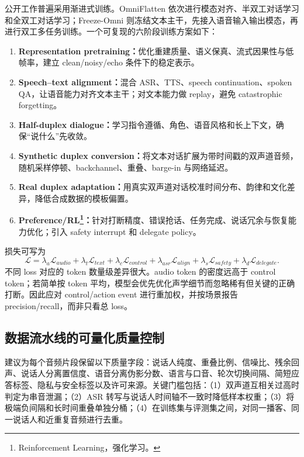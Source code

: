 \documentclass[UTF8,fontset=none,a4paper,10pt]{ctexart}
\begin{document}
公开工作普遍采用渐进式训练。OmniFlatten 依次进行模态对齐、半双工对话学习和全双工对话学习\cite{zhang2024omniflatten}；Freeze-Omni 则冻结文本主干，先接入语音输入输出模态，再进行双工多任务训练\cite{wang2024freezeomni}。一个可复现的六阶段训练方案如下：

\begin{enumerate}
  \item \textbf{Representation pretraining：}优化重建质量、语义保真、流式因果性与低帧率，建立 clean/noisy/echo 条件下的稳定表示。
  \item \textbf{Speech--text alignment：}混合 ASR、TTS、speech continuation、spoken QA，让语音能力对齐文本主干；对文本能力做 replay，避免 catastrophic forgetting。
  \item \textbf{Half-duplex dialogue：}学习指令遵循、角色、语音风格和长上下文，确保“说什么”先收敛。
  \item \textbf{Synthetic duplex conversion：}将文本对话扩展为带时间戳的双声道音频，随机采样停顿、backchannel、重叠、barge-in 与网络延迟。
  \item \textbf{Real duplex adaptation：}用真实双声道对话校准时间分布、韵律和文化差异，降低合成数据的模板偏置。
  \item \textbf{Preference/RL\footnote{Reinforcement Learning，强化学习。}：}针对打断精度、错误抢话、任务完成、说话冗余与恢复能力优化；引入 safety interrupt 和 delegate policy。
\end{enumerate}

损失可写为
\begin{equation}
\mathcal L=\lambda_a\mathcal L_{audio}+\lambda_t\mathcal L_{text}+\lambda_c\mathcal L_{control}
+\lambda_{asr}\mathcal L_{align}+\lambda_s\mathcal L_{safety}+\lambda_d\mathcal L_{delegate}.
\end{equation}
不同 loss 对应的 token 数量级差异很大。audio token 的密度远高于 control token；若简单按 token 平均，模型会优先优化声学细节而忽略稀有但关键的正确打断。因此应对 control/action event 进行重加权，并按场景报告 precision/recall，而非只看总 loss。

\subsection{数据流水线的可量化质量控制}

建议为每个音频片段保留以下质量字段：说话人纯度、重叠比例、信噪比、残余回声、说话人分离置信度、语音分离伪影分数、语言与口音、轮次切换间隔、简短应答标签、隐私与安全标签以及许可来源。关键门槛包括：（1）双声道互相关过高时判定为串音泄漏；（2）ASR 转写与说话人时间轴不一致时降低样本权重；（3）将极端负间隔和长时间重叠单独分桶；（4）在训练集与评测集之间，对同一播客、同一说话人和近重复音频进行去重。
\end{document}
